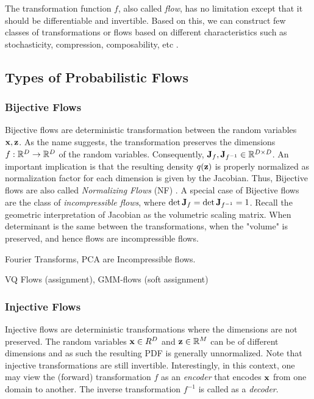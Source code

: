 \documentclass[a4paper, 11pt]{article}
\begin{document}
The transformation function $f$, also called \emph{flow}, has no limitation except that it should be differentiable and invertible. Based on this, we can construct few classes of transformations or flows based on different characteristics such as stochasticity, compression, composability, etc \citep{kothe2023review}.


\subsection{Types of Probabilistic Flows}

\subsubsection{Bijective Flows}
Bijective flows are deterministic transformation between the random variables $\mbox{$\mbox{$\mathbf{x}$}$}, \mbox{$\mbox{$\mathbf{z}$}$}$. As the name suggests, the transformation preserves the dimensions $f: \mathbb{R}^D \to \mathbb{R}^D$ of the random variables. Consequently, $\mbox{$\mbox{$\mathbf{J}$}$}_{f}, \mbox{$\mbox{$\mathbf{J}$}$}_{f^{-1}} \in \mathbb{R}^{D \times D}$. An important implication is that the resulting density $q(\mbox{$\mbox{$\mathbf{z}$}$})$ is properly normalized as normalization factor for each dimension is given by the Jacobian. Thus, Bijective flows are also called \emph{Normalizing Flows} (NF) \citep{papamakarios2021normalizing}. A special case of Bijective flows are the class of \emph{incompressible flows}, where $\det \mbox{$\mbox{$\mathbf{J}$}$}_f = \det \mbox{$\mbox{$\mathbf{J}$}$}_{f^{-1}} = 1$. Recall the geometric interpretation of Jacobian as the volumetric scaling matrix. When determinant is the same between the transformations, when the "volume" is preserved, and hence flows are incompressible flows. 

Fourier Transforms, PCA are Incompressible flows. 

VQ Flows (assignment), GMM-flows (soft assignment)


\subsubsection{Injective Flows}
Injective flows are deterministic transformations where the dimensions are not preserved. The random variables $\mbox{$\mbox{$\mathbf{x}$}$} \in R^D$ and $\mbox{$\mbox{$\mathbf{z}$}$} \in \mathbb{R}^M$ can be of different dimensions and as such the resulting PDF is generally unnormalized. Note that injective transformations are still invertible. Interestingly, in this context, one may view the (forward) transformation $f$ as an \emph{encoder} that encodes $\mbox{$\mbox{$\mathbf{x}$}$}$ from one domain to another. The inverse transformation $f^{-1}$ is called as a \emph{decoder}.
\end{document}
